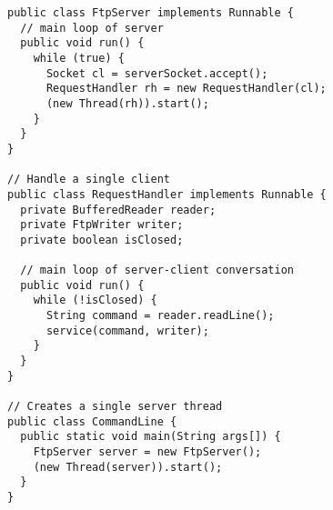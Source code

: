 \begin{lstlisting}[frame=single]
public class FtpServer implements Runnable {
  // main loop of server
  public void run() {
    while (true) {
      Socket cl = serverSocket.accept();
      RequestHandler rh = new RequestHandler(cl);
      (new Thread(rh)).start();
    }
  }
}

// Handle a single client
public class RequestHandler implements Runnable {
  private BufferedReader reader;
  private FtpWriter writer;
  private boolean isClosed;

  // main loop of server-client conversation
  public void run() {
    while (!isClosed) {
      String command = reader.readLine();
      service(command, writer);
    }
  }
}

// Creates a single server thread
public class CommandLine {
  public static void main(String args[]) {
    FtpServer server = new FtpServer();
    (new Thread(server)).start();
  }
}
\end{lstlisting}
